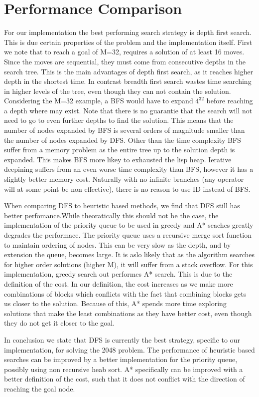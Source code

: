 \documentclass[paper=a4, fontsize=11pt]{scrartcl}
\numberwithin{equation}{section}		%
\numberwithin{figure}{section}			%
\numberwithin{table}{section}				%
\begin{document}
\section{Performance Comparison}
For our implementation the best performing search strategy is depth first search. This is due certain properties of the problem and the implementation itself. First we note that to reach a goal of M=32, requires a solution of at least 16 moves. Since the moves are sequential, they must come from consecutive depths in the search tree. This is the main advantages of depth first search, as it reaches higher depth in the shortest time. In contrast breadth first search wastes time searching in higher levels of the tree, even though they can not contain the solution. Considering the M=32 example, a BFS would have to expand $4^{32}$ before reaching a depth where may exist. Note that there is no guarantie that the search will not need to go to even further depths to find the solution. This means that the number of nodes expanded by BFS is several orders of magnitude smaller than the number of nodes expanded by DFS.
Other than the time complexity BFS suffer from a memory problem as the entire tree up to the solution depth is expanded. This makes BFS more likey to exhausted the lisp heap. Ierative deepining suffers from an even worse time complexity than BFS, however it has a slightly better memory cost. Naturally with no infinite branches (any operator will at some point be non effective), there is no reason to use ID instead of BFS.

When comparing DFS to heuristic based methods, we find that DFS still has better perfomance.While theoratically this should not be the case, the implementation of the priority queue to be used in greedy and A* seaches greatly degrades the performace. The priority queue uses a recursive merge sort function to maintain ordering of nodes. This can be very slow as the depth, and by extension the queue, becomes large. It is aslo likely that as the algorithm searches for higher order solutions (higher M), it will suffer from a stack overflow. For this implementation, greedy search out performes A* search. This is due to the definition of the cost. In our definition, the cost increases as we make more combinations of blocks which conflicts with the fact that combining blocks gets us closer to the solution. Because of this, A* spends more time exploring solutions that make the least combinations as they have better cost, even though they do not get it closer to the goal.

In conclusion we state that DFS is currently the best strategy, specific to our implementation, for solving the 2048 problem. The performance of heuristic based searches can be improved by a better implementation for the priority queue, possibly using non recursive heab sort. A* specifically can be improved with a better definition of the cost, such that it does not conflict with the direction of reaching the goal node. 
\end{document}
